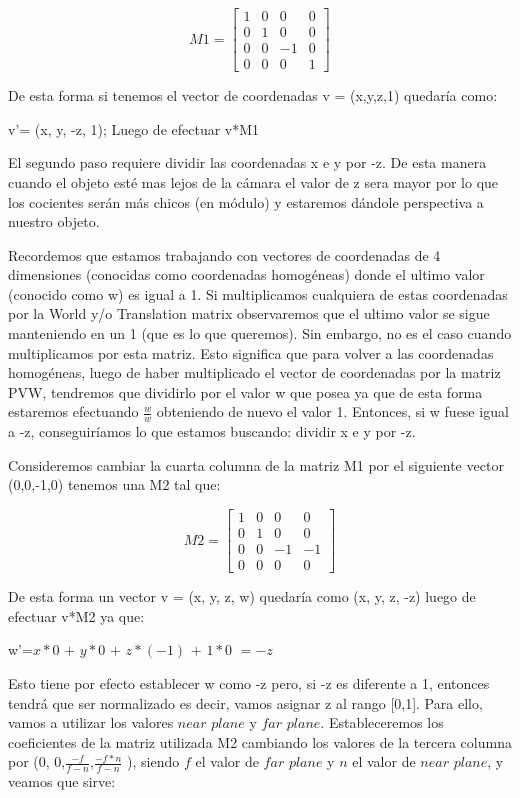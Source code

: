 \documentclass[a4paper]{article}
\newcounter{col}
\begin{document}
\[
M1 =
\begin{bmatrix}
1 & 0 & 0 & 0 \\
0 & 1 & 0 & 0 \\
0 & 0 & -1 & 0 \\
0 & 0 & 0 & 1  
\end{bmatrix}
\]


De esta forma si tenemos el vector de coordenadas v = (x,y,z,1) quedaría como: \newline

v'= (x, y, -z, 1); Luego de efectuar v*M1\newline

El segundo paso requiere dividir las coordenadas x e y por -z. De esta manera cuando el objeto esté mas lejos de la cámara el valor de z sera mayor por lo que los cocientes serán más chicos (en módulo) y estaremos dándole perspectiva a nuestro objeto.
\par Recordemos que estamos trabajando con vectores de coordenadas de 4 dimensiones (conocidas como coordenadas homogéneas) donde el ultimo valor (conocido como w) es igual a 1. Si multiplicamos cualquiera de estas coordenadas por la World y/o Translation matrix observaremos que el ultimo valor se sigue manteniendo en un 1 (que es lo que queremos). Sin embargo, no es el caso cuando multiplicamos por esta matriz. Esto significa que para volver a las coordenadas homogéneas, luego de haber multiplicado el vector de coordenadas por la matriz PVW, tendremos que dividirlo por el valor w que posea ya que de esta forma estaremos efectuando $\frac{w}{w}$ obteniendo de nuevo el valor 1. Entonces, si w fuese igual a -z, conseguiríamos lo que estamos buscando: dividir x e y por -z.\newline

Consideremos cambiar la cuarta columna de la matriz M1 por el siguiente vector (0,0,-1,0) tenemos una M2 tal que:

\[
M2 =
\begin{bmatrix}
1 & 0 & 0 & 0 \\
0 & 1 & 0 & 0 \\
0 & 0 & -1 & -1 \\
0 & 0 & 0 & 0 
\end{bmatrix}
\]

De esta forma un vector v = (x, y, z, w) quedaría como (x, y, z, -z) luego de efectuar v*M2 ya que:\newline

w'=$x*0$ $+$ $y*0$ $+$ $z*(-1)$ $+$ $1*0$ $=-z$

Esto tiene por efecto establecer w como -z pero, si -z es diferente a 1, entonces tendrá que ser normalizado es decir, vamos asignar z al rango [0,1]. Para ello, vamos a utilizar los valores $near$ $plane$ y $far$ $plane$. \newline
Estableceremos los coeficientes de la matriz utilizada M2 cambiando los valores de la tercera columna por (0, 0,$\frac{-f}{f-n}$,$\frac{-f*n}{f-n}$ ), siendo $f$ el valor de $far$ $plane$ y $n$ el valor de $near$ $plane$, y veamos que sirve:\newline
\end{document}
